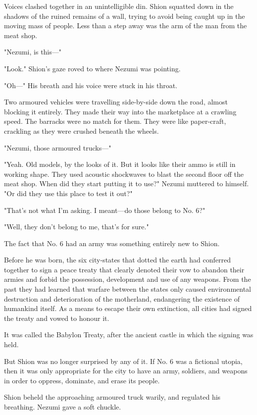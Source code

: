 \myspace

Voices clashed together in an unintelligible din. Shion squatted down in
the shadows of the ruined remains of a wall, trying to avoid being
caught up in the moving mass of people. Less than a step away was the
arm of the man from the meat shop.

"Nezumi, is this---"

"Look." Shion's gaze roved to where Nezumi was pointing.

"Oh---" His breath and his voice were stuck in his throat.

Two armoured vehicles were travelling side-by-side down the road, almost
blocking it entirely. They made their way into the marketplace at a
crawling speed. The barracks were no match for them. They were like
paper-craft, crackling as they were crushed beneath the wheels.

"Nezumi, those armoured trucks---"

"Yeah. Old models, by the looks of it. But it looks like their ammo is
still in working shape. They used acoustic shockwaves to blast the
second floor off the meat shop. When did they start putting it to use?"
Nezumi muttered to himself. "Or did they use this place to test it out?"

"That's not what I'm asking. I meant---do those belong to No. 6?"

"Well, they don't belong to me, that's for sure."

The fact that No. 6 had an army was something entirely new to Shion.

Before he was born, the six city-states that dotted the earth had
conferred together to sign a peace treaty that clearly denoted their vow
to abandon their armies and forbid the possession, development and use
of any weapons. From the past they had learned that warfare between the
states only caused environmental destruction and deterioration of the
motherland, endangering the existence of humankind itself. As a means to
escape their own extinction, all cities had signed the treaty and vowed
to honour it.

It was called the Babylon Treaty, after the ancient castle in which the
signing was held.

But Shion was no longer surprised by any of it. If No. 6 was a fictional
utopia, then it was only appropriate for the city to have an army,
soldiers, and weapons in order to oppress, dominate, and erase its
people.

Shion beheld the approaching armoured truck warily, and regulated his
breathing. Nezumi gave a soft chuckle.

